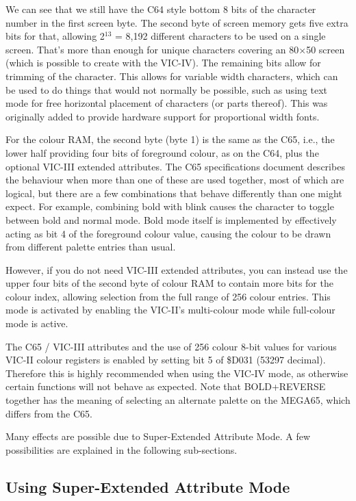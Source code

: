 We can see that we still have the C64 style bottom 8 bits of the character number in the first screen byte. The second byte of screen memory gets five extra bits for that, allowing 2$^{13}$ = 8,192 different characters to be used on a single screen. That's more than enough for unique characters covering an 80$\times$50 screen (which is possible to create with the VIC-IV).  The remaining bits allow for trimming of the character.  This allows for variable width characters, which can be used to do things that would not normally be possible, such as using text mode for free horizontal placement of characters (or parts thereof). This was originally added to provide hardware support for proportional width fonts.

For the colour RAM, the second byte (byte 1) is the same as the C65, i.e., the lower half providing four bits of foreground colour, as on the C64, plus the optional VIC-III extended attributes. The C65 specifications document describes the behaviour when more than one of these are used together, most of which are logical, but there are a few combinations that behave differently than one might expect. For example, combining bold with blink causes the character to toggle between bold and normal mode. Bold mode itself is implemented by effectively acting as bit 4 of the foreground colour value, causing the colour to be drawn from different palette entries than usual.

However, if you do not need VIC-III extended attributes, you can instead use the upper four bits of the second byte of colour RAM to contain more bits for the colour index, allowing selection from the full range of 256 colour entries.  This mode is activated by enabling the VIC-II's multi-colour mode while full-colour mode is active.

The C65 / VIC-III attributes and the use of 256 colour 8-bit values for various VIC-II colour registers is enabled by setting bit 5 of \$D031 (53297 decimal).  Therefore this is highly recommended when using the VIC-IV mode, as otherwise certain functions will not behave as expected. Note that BOLD+REVERSE together has the meaning of selecting an alternate palette on the MEGA65, which differs from the C65.

Many effects are possible due to Super-Extended Attribute Mode.  A few possibilities are explained in the following sub-sections.

\subsection{Using Super-Extended Attribute Mode}

